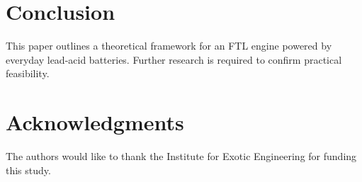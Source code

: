 \documentclass[conference]{IEEEtran} %
\begin{document}
\section{Conclusion}
This paper outlines a theoretical framework for an FTL engine powered by everyday lead-acid batteries. Further research is required to confirm practical feasibility.

\section*{Acknowledgments}
The authors would like to thank the Institute for Exotic Engineering for funding this study.


\end{document}
